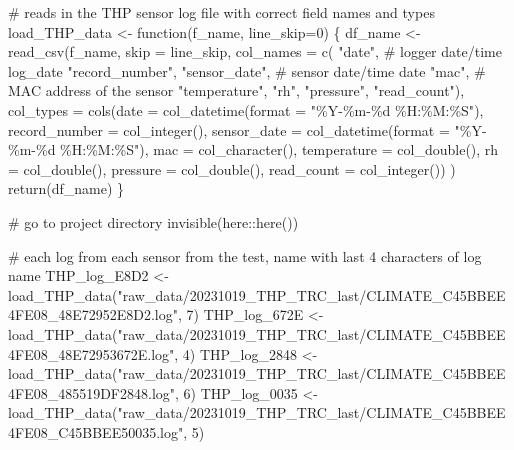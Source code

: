 \documentclass[
  letterpaper,
  DIV=11,
  numbers=noendperiod]{scrartcl}
\newenvironment{Shaded}{\begin{snugshade}}{\end{snugshade}}
\newcommand{\AttributeTok}[1]{\textcolor[rgb]{0.40,0.45,0.13}{#1}}
\newcommand{\CommentTok}[1]{\textcolor[rgb]{0.37,0.37,0.37}{#1}}
\newcommand{\ControlFlowTok}[1]{\textcolor[rgb]{0.00,0.23,0.31}{#1}}
\newcommand{\DecValTok}[1]{\textcolor[rgb]{0.68,0.00,0.00}{#1}}
\newcommand{\FunctionTok}[1]{\textcolor[rgb]{0.28,0.35,0.67}{#1}}
\newcommand{\NormalTok}[1]{\textcolor[rgb]{0.00,0.23,0.31}{#1}}
\newcommand{\OtherTok}[1]{\textcolor[rgb]{0.00,0.23,0.31}{#1}}
\newcommand{\SpecialCharTok}[1]{\textcolor[rgb]{0.37,0.37,0.37}{#1}}
\newcommand{\StringTok}[1]{\textcolor[rgb]{0.13,0.47,0.30}{#1}}
\begin{document}
\begin{Shaded}
\begin{Highlighting}[]
\CommentTok{\# reads in the THP sensor log file with correct field names and types}
\NormalTok{load\_THP\_data }\OtherTok{\textless{}{-}} \ControlFlowTok{function}\NormalTok{(f\_name, }\AttributeTok{line\_skip=}\DecValTok{0}\NormalTok{) \{}
\NormalTok{  df\_name }\OtherTok{\textless{}{-}} \FunctionTok{read\_csv}\NormalTok{(f\_name,}
  \AttributeTok{skip =}\NormalTok{ line\_skip,}
  \AttributeTok{col\_names =} \FunctionTok{c}\NormalTok{(}
    \StringTok{"date"}\NormalTok{, }\CommentTok{\# logger date/time log\_date}
    \StringTok{"record\_number"}\NormalTok{,}
    \StringTok{"sensor\_date"}\NormalTok{, }\CommentTok{\# sensor date/time date}
    \StringTok{"mac"}\NormalTok{, }\CommentTok{\# MAC address of the sensor}
    \StringTok{"temperature"}\NormalTok{,}
    \StringTok{"rh"}\NormalTok{,}
    \StringTok{"pressure"}\NormalTok{,}
    \StringTok{"read\_count"}\NormalTok{),}
  \AttributeTok{col\_types =} \FunctionTok{cols}\NormalTok{(}\AttributeTok{date =} \FunctionTok{col\_datetime}\NormalTok{(}\AttributeTok{format =} \StringTok{"\%Y{-}\%m{-}\%d \%H:\%M:\%S"}\NormalTok{), }
    \AttributeTok{record\_number =} \FunctionTok{col\_integer}\NormalTok{(),}
    \AttributeTok{sensor\_date =} \FunctionTok{col\_datetime}\NormalTok{(}\AttributeTok{format =} \StringTok{"\%Y{-}\%m{-}\%d \%H:\%M:\%S"}\NormalTok{),}
    \AttributeTok{mac =} \FunctionTok{col\_character}\NormalTok{(),}
    \AttributeTok{temperature =} \FunctionTok{col\_double}\NormalTok{(),}
    \AttributeTok{rh =} \FunctionTok{col\_double}\NormalTok{(),}
    \AttributeTok{pressure =} \FunctionTok{col\_double}\NormalTok{(),}
    \AttributeTok{read\_count =} \FunctionTok{col\_integer}\NormalTok{())}
\NormalTok{  )}
  \FunctionTok{return}\NormalTok{(df\_name)}
\NormalTok{\}}

\CommentTok{\# go to project directory}
\FunctionTok{invisible}\NormalTok{(here}\SpecialCharTok{::}\FunctionTok{here}\NormalTok{())}

\CommentTok{\# each log from each sensor from the test, name with last 4 characters of log name}
\NormalTok{THP\_log\_E8D2 }\OtherTok{\textless{}{-}} \FunctionTok{load\_THP\_data}\NormalTok{(}\StringTok{"raw\_data/20231019\_THP\_TRC\_last/CLIMATE\_C45BBEE4FE08\_48E72952E8D2.log"}\NormalTok{, }\DecValTok{7}\NormalTok{)}
\NormalTok{THP\_log\_672E }\OtherTok{\textless{}{-}} \FunctionTok{load\_THP\_data}\NormalTok{(}\StringTok{"raw\_data/20231019\_THP\_TRC\_last/CLIMATE\_C45BBEE4FE08\_48E72953672E.log"}\NormalTok{, }\DecValTok{4}\NormalTok{)}
\NormalTok{THP\_log\_2848 }\OtherTok{\textless{}{-}} \FunctionTok{load\_THP\_data}\NormalTok{(}\StringTok{"raw\_data/20231019\_THP\_TRC\_last/CLIMATE\_C45BBEE4FE08\_485519DF2848.log"}\NormalTok{, }\DecValTok{6}\NormalTok{)}
\NormalTok{THP\_log\_0035 }\OtherTok{\textless{}{-}} \FunctionTok{load\_THP\_data}\NormalTok{(}\StringTok{"raw\_data/20231019\_THP\_TRC\_last/CLIMATE\_C45BBEE4FE08\_C45BBEE50035.log"}\NormalTok{, }\DecValTok{5}\NormalTok{)}
\end{Highlighting}
\end{Shaded}
\end{document}
